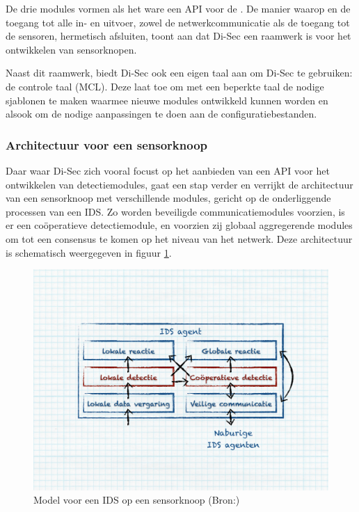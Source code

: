 De drie modules vormen als het ware een API voor de . De manier
waarop  en  de toegang tot alle in- en uitvoer, zowel de
netwerkcommunicatie als de toegang tot de sensoren, hermetisch afsluiten, toont
aan dat Di-Sec een raamwerk is voor het ontwikkelen van sensorknopen.

Naast dit raamwerk, biedt Di-Sec ook een eigen taal aan om Di-Sec te gebruiken:
de  controle taal (MCL). Deze laat toe om met een beperkte taal de
nodige sjablonen te maken waarmee nieuwe modules ontwikkeld kunnen worden en
alsook om de nodige aanpassingen te doen aan de configuratiebestanden.

\subsubsection*{Architectuur voor een sensorknoop}
\label{subsubsection:node-architecture}

Daar waar Di-Sec zich vooral focust op het aanbieden van een API voor het
ontwikkelen van detectiemodules, gaat \citep{zhang2000intrusion} een stap
verder en verrijkt de architectuur van een sensorknoop met verschillende
modules, gericht op de onderliggende processen van een IDS. Zo worden
beveiligde communicatiemodules voorzien, is er een co\"operatieve
detectiemodule, en voorzien zij globaal aggregerende modules om tot een
consensus te komen op het niveau van het netwerk. Deze architectuur is
schematisch weergegeven in figuur \ref{fig:node-architecture}.

\begin{figure}[ht]
  \centering
  \includegraphics[width=0.9\linewidth]{resources/node-architecture.pdf}
  \caption[Model voor een IDS op een sensorknoop]{Model voor een IDS op een
  sensorknoop (Bron:\citep{zhang2000intrusion})}
  \label{fig:node-architecture}
\end{figure}

